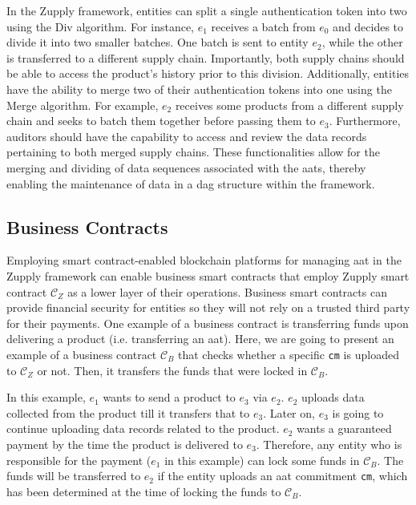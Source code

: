 In the Zupply framework, entities can split a single authentication token into two using the \textsf{Div} algorithm. For instance, ${e_{1}}$ receives a batch from ${e_{0}}$ and decides to divide it into two smaller batches. One batch is sent to entity ${e_{2}}$, while the other is transferred to a different supply chain. Importantly, both supply chains should be able to access the product's history prior to this division. Additionally, entities have the ability to merge two of their authentication tokens into one using the \textsf{Merge} algorithm. For example, ${e_{2}}$ receives some products from a different supply chain and seeks to batch them together before passing them to ${e_{3}}$. Furthermore, auditors should have the capability to access and review the data records pertaining to both merged supply chains. These functionalities allow for the merging and dividing of data sequences associated with the \gls{aat}s, thereby enabling the maintenance of data in a \gls{dag} structure within the framework.



\subsection{Business Contracts}
\label{App:Business Contracts}


Employing smart contract-enabled blockchain platforms for managing \gls{aat} in the Zupply framework can enable business smart contracts that employ Zupply smart contract $\mathcal{C}_Z$ as a lower layer of their operations. Business smart contracts can provide financial security for entities so they will not rely on a trusted third party for their payments. One example of a business contract is transferring funds upon delivering a product (i.e. transferring an \gls{aat}). Here, we are going to present an example of a business contract $\mathcal{C}_B$ that checks whether a specific \texttt{cm} is uploaded to $\mathcal{C}_Z$ or not. Then, it transfers the funds that were locked in $\mathcal{C}_B$.

In this example, $e_1$ wants to send a product to $e_3$ via $e_2$. $e_2$ uploads data collected from the product till it transfers that to $e_3$. Later on, $e_3$ is going to continue uploading data records related to the product. $e_2$ wants a guaranteed payment by the time the product is delivered to $e_3$. Therefore, any entity who is responsible for the payment ($e_1$ in this example) can lock some funds in $\mathcal{C}_B$. The funds will be transferred to $e_2$ if the entity uploads an \gls{aat} commitment \texttt{cm}, which has been determined at the time of locking the funds to $\mathcal{C}_B$.


